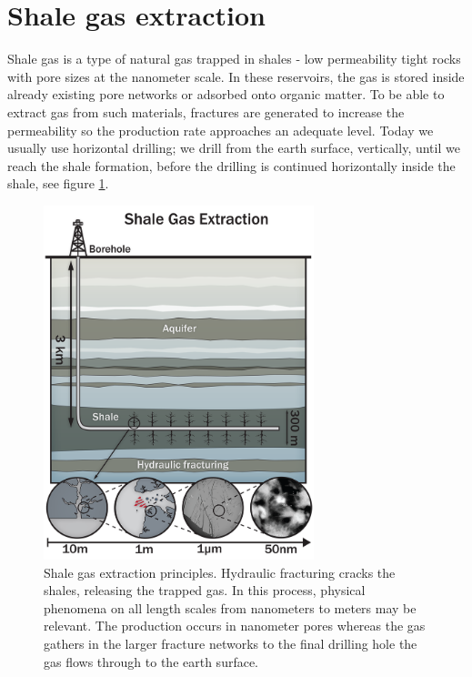 \section{Shale gas extraction}
Shale gas is a type of natural gas trapped in shales - low permeability tight rocks with pore sizes at the nanometer scale. In these reservoirs, the gas is stored inside already existing pore networks or adsorbed onto organic matter. To be able to extract gas from such materials, fractures are generated to increase the permeability so the production rate approaches an adequate level. Today we usually use horizontal drilling; we drill from the earth surface, vertically, until we reach the shale formation, before the drilling is continued horizontally inside the shale, see figure \ref{fig:shale_gas_extraction}.
\begin{figure}[h!]
\begin{center}
\includegraphics[width=0.7\textwidth, trim=0cm 0cm 0cm 0cm, clip]{figures/shale_gas_extraction.png}
\end{center}
\caption{Shale gas extraction principles. Hydraulic fracturing cracks the shales, releasing the trapped gas. In this process, physical phenomena on all length scales from nanometers to meters may be relevant. The production occurs in nanometer pores whereas the gas gathers in the larger fracture networks to the final drilling hole the gas flows through to the earth surface. }
\label{fig:shale_gas_extraction}
\end{figure}
